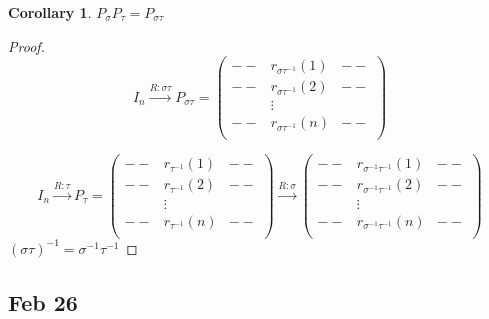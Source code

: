 \documentclass[12pt]{article}
\theoremstyle{plain}
\newtheorem{corollary}{Corollary}[subsection]
\begin{document}
\begin{corollary}
	$P_{\sigma} P_{\tau} = P_{\sigma \tau}$
\end{corollary}
\begin{proof}
	\[
		I_n \overset{R:\sigma \tau} {\longrightarrow} P_{\sigma \tau}
		= 
		\begin{pmatrix}
			-- & r_{\sigma \tau^{-1}}(1) & --\\
			-- & r_{\sigma \tau^{-1}}(2) & --\\
			   & \vdots & \\
			-- & r_{\sigma \tau^{-1}}(n) & --\\
		\end{pmatrix}
	\]
	
	\[
		I_n \overset{R:\tau} {\longrightarrow} P_{\tau}
		= 
		\begin{pmatrix}
			-- & r_{\tau^{-1}}(1) & --\\
			-- & r_{\tau^{-1}}(2) & --\\
			   & \vdots & \\
			-- & r_{\tau^{-1}}(n) & --\\
		\end{pmatrix}
		\overset{R:\sigma} {\longrightarrow}
		\begin{pmatrix}
			-- & r_{\sigma^{-1} \tau^{-1}}(1) & --\\
			-- & r_{\sigma^{-1}\tau^{-1}}(2) & --\\
			   & \vdots & \\
			-- & r_{\sigma^{-1}\tau^{-1}}(n) & --\\
		\end{pmatrix}
	\]
	$(\sigma \tau)^{-1} = \sigma^{-1} \tau^{-1}$
\end{proof}



	\newpage
	\subsection{Feb 26}
\end{document}
